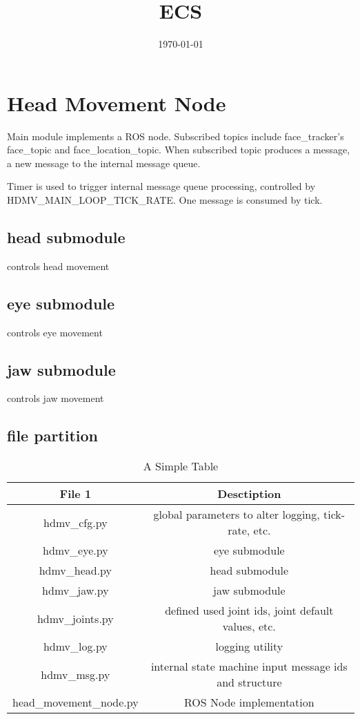 \documentclass[11pt]{article}
\date{\today}
\title{ECS}
\begin{document}
\maketitle
\tableofcontents

\section{Head Movement Node}

Main module implements a ROS node. Subscribed topics include face_tracker's face_topic and face_location_topic. When subscribed topic produces a message, a new message to the internal message queue.

Timer is used to trigger internal message queue processing, controlled by HDMV_MAIN_LOOP_TICK_RATE. One message is consumed by tick.

\subsection{head submodule}
controls head movement

\subsection{eye submodule}
controls eye movement

\subsection{jaw submodule}
controls jaw movement

\subsection{file partition}

\begin{table}[htbp]
  \centering
  \begin{tabular}{|c|c|}
    \hline
    File 1 & Desctiption \\
    \hline
    hdmv_cfg.py & global parameters to alter logging, tick-rate, etc.\\
    \hline
    hdmv_eye.py & eye submodule \\
    \hline
    hdmv_head.py & head submodule \\
    \hline
    hdmv_jaw.py & jaw submodule \\
    \hline
    hdmv_joints.py & defined used joint ids, joint default values, etc. \\
    \hline
    hdmv_log.py & logging utility \\
    \hline
    hdmv_msg.py & internal state machine input message ids and structure \\
    \hline
    head_movement_node.py & ROS Node implementation \\
    \hline

  \end{tabular}
  \caption{A Simple Table}
  \label{tab:simple}
\end{table}
\end{document}
